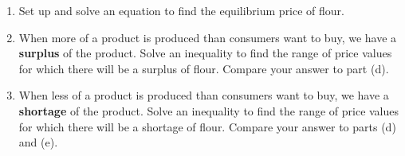 \begin{enumerate}
\begin{enumerate}
\item Set up and solve an equation to find the equilibrium price of flour.\vfill
\item When more of a product is produced than consumers want to buy, we have a \textbf{surplus} of the product.  Solve an inequality to find the range of price values for which there will be a surplus of flour.  Compare your answer to part (d).  \vfill
\item When less of a product is produced than consumers want to buy, we have a \textbf{shortage} of the product.  Solve an inequality to find the range of price values for which there will be a shortage of flour. Compare your answer to parts (d) and (e).  \vfill
\end{enumerate}

\end{enumerate}

